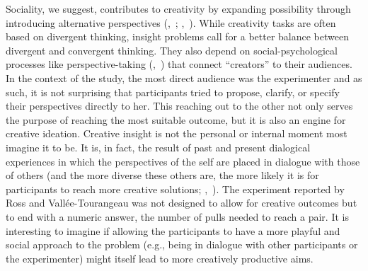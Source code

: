 \documentclass[twocolumn, issue, reflection, authordate]{jote-new-article}
\begin{document}
Sociality, we suggest, contributes to creativity by expanding
possibility through introducing alternative perspectives (,~\citeyear{Glaveanu2020}; ,~\citeyear{Zittoun2015}). While creativity tasks are often based on
divergent thinking, insight problems call for a better balance between
divergent and convergent thinking. They also depend on
social-psychological processes like perspective-taking (,~\citeyear{Glaveanu2015})
that connect ``creators'' to their audiences. In the context of the
study, the most direct audience was the experimenter and as such, it is
not surprising that participants tried to propose, clarify, or specify
their perspectives directly to her. This reaching out to the other not
only serves the purpose of reaching the most suitable outcome, but it is
also an engine for creative ideation. Creative insight is not the
personal or internal moment most imagine it to be. It is, in fact, the
result of past and present dialogical experiences in which the
perspectives of the self are placed in dialogue with those of others
(and the more diverse these others are, the more likely it is for
participants to reach more creative solutions; ,~\citeyear{Gassmann2001}). The
experiment reported by Ross and Vallée-Tourangeau was not designed to
allow for creative outcomes but to end with a numeric answer, the number
of pulls needed to reach a pair. It is interesting to imagine if allowing the participants to have a more playful and social approach to the problem (e.g., being in dialogue with other participants or the experimenter) might itself lead to more creatively productive aims.
\end{document}
